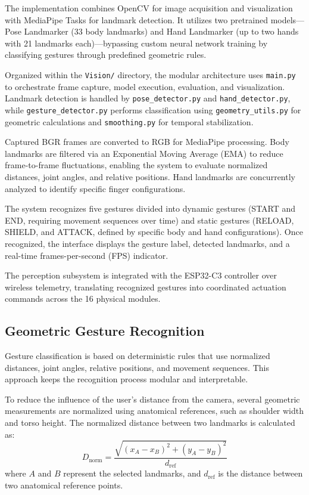 \documentclass[lettersize,journal]{IEEEtran}
\begin{document}
	The implementation combines OpenCV for image acquisition and visualization with MediaPipe Tasks for landmark detection. It utilizes two pretrained models—Pose Landmarker (33 body landmarks) and Hand Landmarker (up to two hands with 21 landmarks each)—bypassing custom neural network training by classifying gestures through predefined geometric rules.
	
	Organized within the \texttt{Vision/} directory, the modular architecture uses \texttt{main.py} to orchestrate frame capture, model execution, evaluation, and visualization. Landmark detection is handled by \texttt{pose\_detector.py} and \texttt{hand\_detector.py}, while \texttt{gesture\_detector.py} performs classification using \texttt{geometry\_utils.py} for geometric calculations and \texttt{smoothing.py} for temporal stabilization.
	
	Captured BGR frames are converted to RGB for MediaPipe processing. Body landmarks are filtered via an Exponential Moving Average (EMA) to reduce frame-to-frame fluctuations, enabling the system to evaluate normalized distances, joint angles, and relative positions. Hand landmarks are concurrently analyzed to identify specific finger configurations.
	
	The system recognizes five gestures divided into dynamic gestures (START and END, requiring movement sequences over time) and static gestures (RELOAD, SHIELD, and ATTACK, defined by specific body and hand configurations). Once recognized, the interface displays the gesture label, detected landmarks, and a real-time frames-per-second (FPS) indicator.
	
	The perception subsystem is integrated with the ESP32-C3 controller over wireless telemetry, translating recognized gestures into coordinated actuation commands across the 16 physical modules.
	
	\subsection{Geometric Gesture Recognition}
	
	Gesture classification is based on deterministic rules that use normalized distances, joint angles, relative positions, and movement sequences. This approach keeps the recognition process modular and interpretable.

	To reduce the influence of the user's distance from the camera, several geometric measurements are normalized using anatomical references, such as shoulder width and torso height. The normalized distance between two landmarks is calculated as:
	\begin{equation}
		D_{\text{norm}} = \frac{\sqrt{(x_A - x_B)^2 + (y_A - y_B)^2}}{d_{\text{ref}}}
	\end{equation}
	where $A$ and $B$ represent the selected landmarks, and $d_{\text{ref}}$ is the distance between two anatomical reference points.
	
\end{document}
